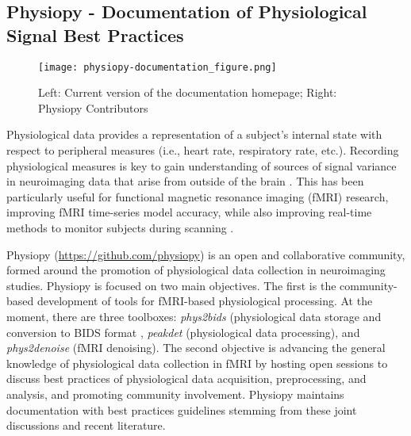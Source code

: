 \documentclass[../main.tex]{subfiles}
\begin{document}
\subsection{Physiopy - Documentation of Physiological Signal Best Practices}


\begin{figure}
	\centering
	\texttt{[image: physiopy-documentation\_figure.png]}
	\caption{Left: Current version of the documentation homepage; Right: Physiopy Contributors}
	\label{fig:physiopy_beforeafter}
\end{figure}


Physiological data provides a representation of a subject’s internal state with respect to peripheral measures (i.e., heart rate, respiratory rate, etc.). Recording physiological measures is key to gain understanding of sources of signal variance in neuroimaging data that arise from outside of the brain \parencite{chen2020}. This has been particularly useful for functional magnetic resonance imaging (fMRI) research, improving fMRI time-series model accuracy, while also improving real-time methods to monitor subjects during scanning \parencite{bulte2017, caballero-gaudes2017}. 

Physiopy (\url{https://github.com/physiopy}) is an open and collaborative community, formed around the promotion of physiological data collection in neuroimaging studies. Physiopy is focused on two main objectives. The first is the community-based development of tools for fMRI-based physiological processing. At the moment, there are three toolboxes: \textit{phys2bids} (physiological data storage and conversion to BIDS format \parencite{phys2bids}, \textit{peakdet} (physiological data processing), and \textit{phys2denoise} (fMRI denoising). The second objective is advancing the general knowledge of physiological data collection in fMRI by hosting open sessions to discuss best practices of physiological data acquisition, preprocessing, and analysis, and promoting community involvement. Physiopy maintains documentation with best practices guidelines stemming from these joint discussions and recent literature.
\end{document}

